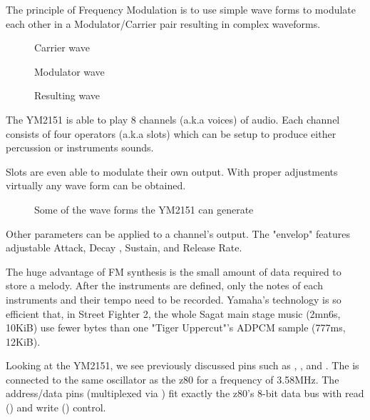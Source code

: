 The principle of Frequency Modulation is to use simple wave forms to modulate each other in a Modulator/Carrier pair resulting in complex waveforms\cite{fmProgramming}.

\begin{figure}[H]
\caption*{Carrier wave}
\end{figure}

\begin{figure}[H]
\caption*{Modulator wave}
\end{figure}

\begin{figure}[H]
\caption*{Resulting wave}
\end{figure}







The YM2151 is able to play 8 channels (a.k.a voices) of audio. Each channel consists of four operators (a.k.a slots) which can be setup to produce either percussion or instruments sounds.  

Slots are even able to modulate their own output. With proper adjustments virtually any wave form can be obtained. 
 
\begin{figure}[H]
\caption*{Some of the wave forms the YM2151 can generate}
\end{figure}


Other parameters can be applied to a channel's output. The "envelop" features adjustable Attack, Decay , Sustain, and Release Rate. 


The huge advantage of FM synthesis is the small amount of data required to store a melody. After the instruments are defined, only the notes of each instruments and their tempo need to be recorded. Yamaha's technology is so efficient that, in Street Fighter 2, the whole Sagat main stage music (2mn6s, 10KiB) use fewer bytes than one "Tiger Uppercut"'s ADPCM sample (777ms, 12KiB).




Looking at the YM2151, we see previously discussed pins such as , , and . The  is connected to the same oscillator as the z80 for a frequency of 3.58MHz. The  address/data pins (multiplexed via ) fit exactly the z80's 8-bit data bus with read () and write () control.


